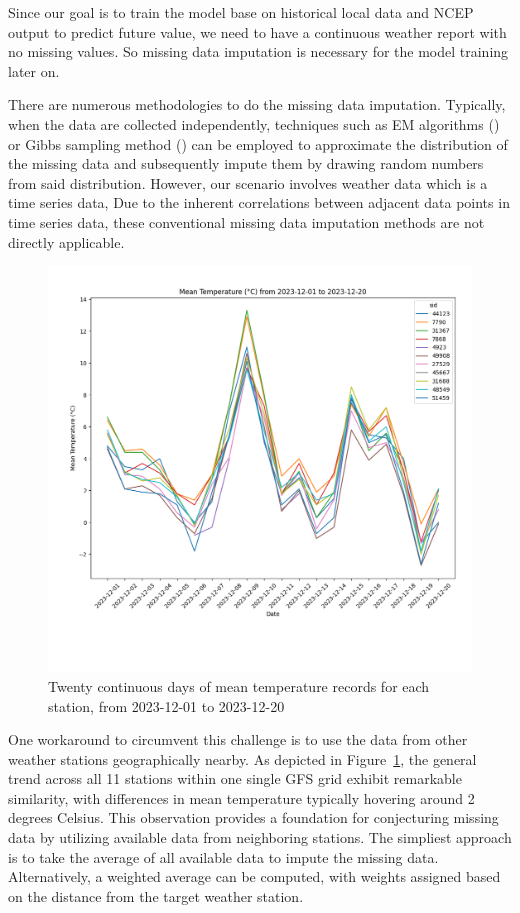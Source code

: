 \documentclass[12pt]{article}
\begin{document}
Since our goal is to train the model base on historical local data and NCEP output to predict future value, we need to have a continuous weather report with no missing values. So missing data imputation is necessary for the model training later on.

There are numerous methodologies to do the missing data imputation. Typically, when the data are collected independently, techniques such as EM algorithms (\cite{Raheem2024}) or Gibbs sampling method (\cite{Hoff2009}) can be employed to approximate the distribution of the missing data and subsequently impute them by drawing random numbers from said distribution. However, our scenario involves weather data which is a time series data, Due to the inherent correlations between adjacent data points in time series data, these conventional missing data imputation methods are not directly applicable.

\begin{figure}[htpb]
	\centering
	\includegraphics[width=\textwidth]{pic/MD-example.png}
	\caption{Twenty continuous days of mean temperature records for each station, from 2023-12-01 to 2023-12-20}
	\label{Fig:Dataplot}
\end{figure}

One workaround to circumvent this challenge is to use the data from other weather stations geographically nearby. As depicted in Figure~\ref{Fig:Dataplot}, the general trend across all 11 stations within one single GFS grid exhibit remarkable similarity, with differences in mean temperature typically hovering around 2 degrees Celsius. This observation provides a foundation for conjecturing missing data by utilizing available data from neighboring stations. The simpliest approach is to take the average of all available data to impute the missing data. Alternatively, a weighted average can be computed, with weights assigned based on the distance from the target weather station.
\end{document}
